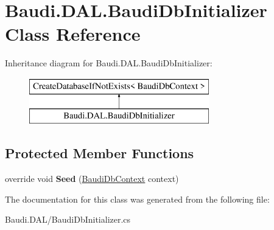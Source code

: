 \hypertarget{class_baudi_1_1_d_a_l_1_1_baudi_db_initializer}{}\section{Baudi.\+D\+A\+L.\+Baudi\+Db\+Initializer Class Reference}
\label{class_baudi_1_1_d_a_l_1_1_baudi_db_initializer}
Inheritance diagram for Baudi.\+D\+A\+L.\+Baudi\+Db\+Initializer\+:\begin{figure}[H]
\begin{center}
\leavevmode
\includegraphics[height=2.000000cm]{class_baudi_1_1_d_a_l_1_1_baudi_db_initializer}
\end{center}
\end{figure}
\subsection*{Protected Member Functions}
\begin{DoxyCompactItemize}
\item 
\hypertarget{class_baudi_1_1_d_a_l_1_1_baudi_db_initializer_a3fd3ac722c945e44db2a5d5e2a32358e}{}override void {\bfseries Seed} (\hyperlink{class_baudi_1_1_d_a_l_1_1_baudi_db_context}{Baudi\+Db\+Context} context)\label{class_baudi_1_1_d_a_l_1_1_baudi_db_initializer_a3fd3ac722c945e44db2a5d5e2a32358e}

\end{DoxyCompactItemize}


The documentation for this class was generated from the following file\+:\begin{DoxyCompactItemize}
\item 
Baudi.\+D\+A\+L/Baudi\+Db\+Initializer.\+cs\end{DoxyCompactItemize}
